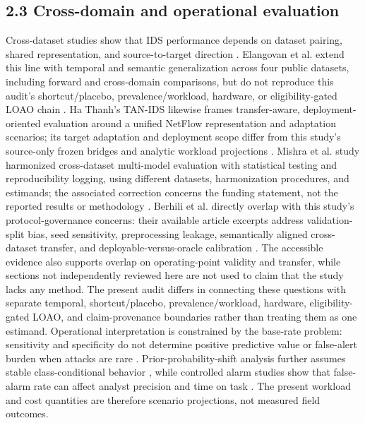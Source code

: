 \documentclass[preprint,12pt]{elsarticle}
\begin{document}
\subsection{2.3 Cross-domain and operational evaluation}
Cross-dataset studies show that IDS performance depends on dataset pairing, shared representation, and source-to-target direction \cite{dhooge2020interdataset, layeghy2023crossdomain, cantone2024crossdataset}. Elangovan et al. extend this line with temporal and semantic generalization across four public datasets, including forward and cross-domain comparisons, but do not reproduce this audit's shortcut/placebo, prevalence/workload, hardware, or eligibility-gated LOAO chain \cite{elangovan2026crossdataset}. Ha Thanh's TAN-IDS likewise frames transfer-aware, deployment-oriented evaluation around a unified NetFlow representation and adaptation scenarios; its target adaptation and deployment scope differ from this study's source-only frozen bridges and analytic workload projections \cite{hathanh2026tanids}. Mishra et al. study harmonized cross-dataset multi-model evaluation with statistical testing and reproducibility logging, using different datasets, harmonization procedures, and estimands; the associated correction concerns the funding statement, not the reported results or methodology \cite{mishra2026harmonized, mishra2026correction}. Berhili et al. directly overlap with this study's protocol-governance concerns: their available article excerpts address validation-split bias, seed sensitivity, preprocessing leakage, semantically aligned cross-dataset transfer, and deployable-versus-oracle calibration \cite{berhili2026protocol}. The accessible evidence also supports overlap on operating-point validity and transfer, while sections not independently reviewed here are not used to claim that the study lacks any method. The present audit differs in connecting these questions with separate temporal, shortcut/placebo, prevalence/workload, hardware, eligibility-gated LOAO, and claim-provenance boundaries rather than treating them as one estimand.
Operational interpretation is constrained by the base-rate problem: sensitivity and specificity do not determine positive predictive value or false-alert burden when attacks are rare \cite{axelsson2000baserate}. Prior-probability-shift analysis further assumes stable class-conditional behavior \cite{saerens2002prior}, while controlled alarm studies show that false-alarm rate can affect analyst precision and time on task \cite{layman2023falsealarms}. The present workload and cost quantities are therefore scenario projections, not measured field outcomes.
\end{document}
